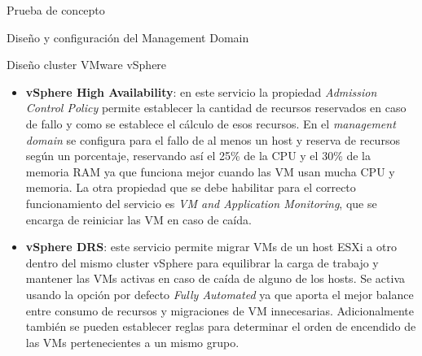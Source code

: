 \begin{section}{Prueba de concepto}
\begin{subsection}{Diseño y configuración del Management Domain}
\begin{subsubsection}{Diseño cluster VMware vSphere}
    \begin{itemize}
        \item \textbf{vSphere High Availability}: en este servicio la propiedad \textit{Admission Control Policy} permite establecer la cantidad de recursos reservados en caso de fallo y como se establece el cálculo de esos recursos. En el \textit{management domain} se configura para el fallo de al menos un host y reserva de recursos según un porcentaje, reservando así el 25\% de la CPU y el 30\% de la memoria RAM ya que funciona mejor cuando las VM usan mucha CPU y memoria. La otra propiedad que se debe habilitar para el correcto funcionamiento del servicio es \textit{VM and Application Monitoring}, que se encarga de reiniciar las VM en caso de caída.
        \item \textbf{vSphere DRS}: este servicio permite migrar VMs de un host ESXi a otro dentro del mismo cluster vSphere para equilibrar la carga de trabajo y mantener las VMs activas en caso de caída de alguno de los hosts. Se activa usando la opción por defecto \textit{Fully Automated} ya que aporta el mejor balance entre consumo de recursos y migraciones de VM innecesarias. Adicionalmente también se pueden establecer reglas para determinar el orden de encendido de las VMs pertenecientes a un mismo grupo. 
    \end{itemize}
    \end{subsubsection}

\end{subsection}
\end{section}
